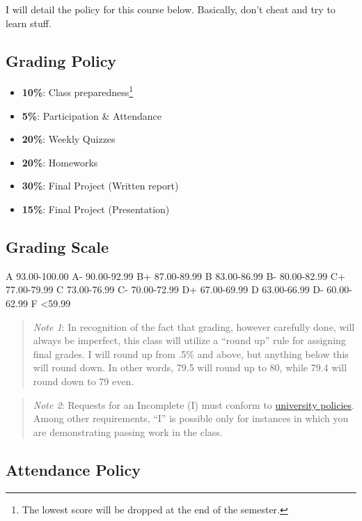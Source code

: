 \documentclass[11pt,]{article}
\begin{document}
I will detail the policy for this course below. Basically, don't cheat
and try to learn stuff.

\hypertarget{grading-policy}{%
\subsection{Grading Policy}\label{grading-policy}}

\begin{itemize}
\item
  \textbf{10\%}: Class preparedness\footnote{The lowest score will be
    dropped at the end of the semester.}
\item
  \textbf{5\%}: Participation \& Attendance
\item
  \textbf{20\%}: Weekly Quizzes
\item
  \textbf{20\%}: Homeworks
\item
  \textbf{30\%}: Final Project (Written report)
\item
  \textbf{15\%}: Final Project (Presentation)
\end{itemize}

\hypertarget{grading-scale}{%
\subsection{Grading Scale}\label{grading-scale}}

A 93.00-100.00 \textbar{} A- 90.00-92.99 B+ 87.00-89.99 \textbar{} B
83.00-86.99 \textbar{} B- 80.00-82.99 C+ 77.00-79.99 \textbar{} C
73.00-76.99 \textbar{} C- 70.00-72.99 D+ 67.00-69.99 \textbar{} D
63.00-66.99 \textbar{} D- 60.00-62.99 F \textless59.99

\begin{quote}
\emph{Note 1}: In recognition of the fact that grading, however
carefully done, will always be imperfect, this class will utilize a
``round up'' rule for assigning final grades. I will round up from .5\%
and above, but anything below this will round down. In other words, 79.5
will round up to 80, while 79.4 will round down to 79 even.
\end{quote}

\begin{quote}
\emph{Note 2}: Requests for an Incomplete (I) must conform to
\href{https://bit.ly/3bDxwZi}{university policies}. Among other
requirements, ``I'' is possible only for instances in which you are
demonstrating passing work in the class.
\end{quote}

\hypertarget{attendance-policy}{%
\subsection{Attendance Policy}\label{attendance-policy}}
\end{document}
